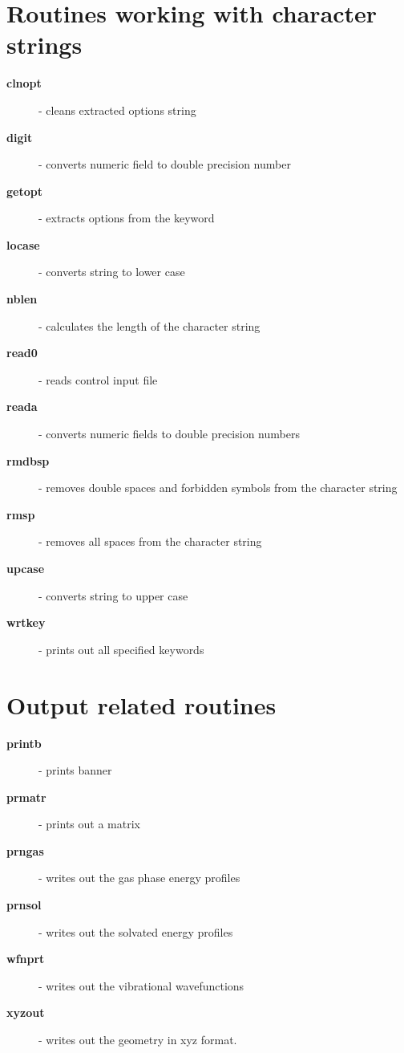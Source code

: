 \documentclass[oneside,11pt,openany]{book}
\newcommand{\tw}{\ttfamily}
\begin{document}
%
\section{Routines working with character strings}
\begin{description}
\item[{\tw\bf clnopt}] - cleans extracted options string
\item[{\tw\bf digit}] - converts numeric field to double precision number
\item[{\tw\bf getopt}] - extracts options from the keyword
\item[{\tw\bf locase}] - converts string to lower case
\item[{\tw\bf nblen}] - calculates the length of the character string
\item[{\tw\bf read0}] - reads control input file
\item[{\tw\bf reada}] - converts numeric fields to double precision numbers
\item[{\tw\bf rmdbsp}] - removes double spaces and forbidden symbols
                      from the character string
\item[{\tw\bf rmsp}] - removes all spaces from the character string
\item[{\tw\bf upcase}] - converts string to upper case
\item[{\tw\bf wrtkey}] - prints out all specified keywords
\end{description}

%
\section{Output related routines}
\begin{description}
\item[{\tw\bf printb}] - prints banner
\item[{\tw\bf prmatr}] - prints out a matrix
\item[{\tw\bf prngas}] - writes out the gas phase energy profiles
\item[{\tw\bf prnsol}] - writes out the solvated energy profiles
\item[{\tw\bf wfnprt}] - writes out the vibrational wavefunctions
\item[{\tw\bf xyzout}] - writes out the geometry in xyz format.
\end{description}

%
\end{document}
